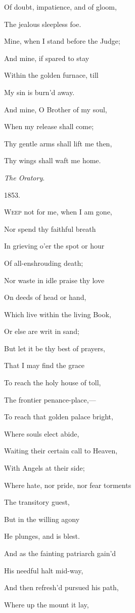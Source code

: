 Of doubt, impatience, and of gloom,

The jealous sleepless foe. 

Mine, when I stand before the Judge;

And mine, if spared to stay

Within the golden furnace, till

My sin is burn'd away.

And mine, O Brother of my soul,

When my release shall come;

Thy gentle arms shall lift me then,

Thy wings shall waft me home.

\emph{The Oratory}.

1853.


W\textsc{eep} not for me, when I am gone,

Nor spend thy faithful breath

In grieving o'er the spot or hour

Of all-enshrouding death;

Nor waste in idle praise thy love

On deeds of head or hand,

Which live within the living Book,

Or else are writ in sand;

But let it be thy best of prayers,

That I may find the grace

To reach the holy house of toll,

The frontier penance-place,—

To reach that golden palace bright,

Where souls elect abide,

Waiting their certain call to Heaven,

With Angels at their side; 

Where hate, nor pride, nor fear torments

The transitory guest,

But in the willing agony

He plunges, and is blest.

And as the fainting patriarch gain'd

His needful halt mid-way,

And then refresh'd pursued his path,

Where up the mount it lay,

